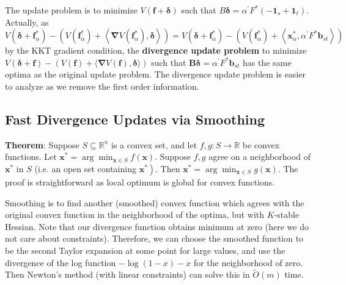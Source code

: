 The update problem is to minimize $V(\boldsymbol{f} + \boldsymbol{\delta})$ such that $B\boldsymbol{\delta} = \alpha^\prime F^* (-\boldsymbol{1}_s + \boldsymbol{1}_t)$. Actually, as $V\left(\boldsymbol{\delta}+\boldsymbol{f}_{\alpha}^{*}\right)-\left(V\left(\boldsymbol{f}_{\alpha}^{*}\right)+\left\langle\boldsymbol{\nabla} V\left(\boldsymbol{f}_{\alpha}^{*}\right), \boldsymbol{\delta}\right\rangle\right)=V\left(\boldsymbol{\delta}+\boldsymbol{f}_{\alpha}^{*}\right)-\left(V\left(\boldsymbol{f}_{\alpha}^{*}\right)+\left\langle\boldsymbol{x}_{\alpha}^{*}, \alpha^{\prime} F^{*} \boldsymbol{b}_{s t}\right\rangle\right)$ by the KKT gradient condition, the \textbf{divergence update problem} to minimize $V(\boldsymbol{\delta}+\boldsymbol{f})-(V(\boldsymbol{f})+\langle\boldsymbol{\nabla} V(\boldsymbol{f}), \boldsymbol{\delta}\rangle)$ such that $\boldsymbol{B} \boldsymbol{\delta}=\alpha^{\prime} F^{*} \boldsymbol{b}_{s t}$ has the same optima as the original update problem. The divergence update problem is easier to analyze as we remove the first order information.

\subsection{Fast Divergence Updates via Smoothing}

\textbf{Theorem}: Suppose $S \subseteq \mathbb{R}^{n}$ is a convex set, and let $f, g: S \rightarrow \mathbb{R}$ be convex functions. Let $\boldsymbol{x}^{*}=\arg \min _{\boldsymbol{x} \in S} f(\boldsymbol{x})$. Suppose $f, g$ agree on a neighborhood of $\boldsymbol{x}^{*}$ in $S$ (i.e. an open set containing $\left.\boldsymbol{x}^{*}\right)$. Then $\boldsymbol{x}^{*}=\arg \min _{\boldsymbol{x} \in S} g(\boldsymbol{x})$. The proof is straightforward as local optimum is global for convex functions.

Smoothing is to find another (smoothed) convex function which agrees with the original convex function in the neighborhood of the optima, but with $K$-stable Hessian. Note that our divergence function obtains minimum at zero (here we do not care about constraints). Therefore, we can choose the smoothed function to be the second Taylor expansion at some point for large values, and use the divergence of the log function $-\log(1-x)-x$ for the neighborhood of zero. Then Newton's method (with linear constraints) can solve this in $\tilde{O}(m)$ time.